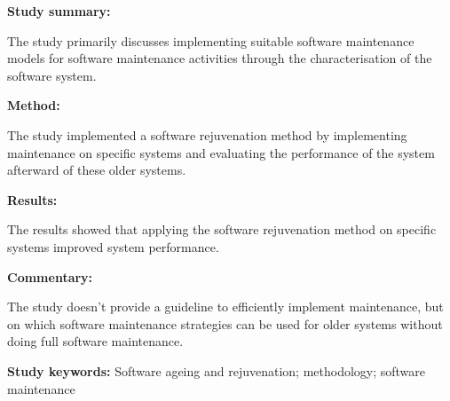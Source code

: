 \begin{tcolorbox}[colback=gray!5!white, colframe=pastelgreen!40!black, title=A Software Maintenance Methodology: An Approach Applied to Software Aging\cite{Araujo2021}]
	\begin{minipage}[t]{0.25\textwidth}
		\textbf{Study summary:}
	\end{minipage}
	\hfill
	\begin{minipage}[t]{0.65\textwidth}
		The study primarily discusses implementing suitable software maintenance models for software
maintenance activities through the characterisation of the software system.
	\end{minipage}

	\vspace{0.75em} 

	\begin{minipage}[t]{0.25\textwidth}
		\textbf{Method:}
	\end{minipage}
	\hfill
	\begin{minipage}[t]{0.65\textwidth}
		The study implemented a software rejuvenation method by implementing maintenance on specific systems and evaluating the performance of the system afterward of these older systems.
	\end{minipage}

	\vspace{0.75em} 

	\begin{minipage}[t]{0.25\textwidth}
		\textbf{Results:}
	\end{minipage}
	\hfill
	\begin{minipage}[t]{0.65\textwidth}
		The results showed that applying the software rejuvenation method on specific systems improved system performance.
	\end{minipage}

	\vspace{0.75em} 

	\begin{minipage}[t]{0.25\textwidth}
		\textbf{Commentary:}
	\end{minipage}
	\hfill
	\begin{minipage}[t]{0.65\textwidth}
		The study doesn't provide a guideline to efficiently implement maintenance, but on which
software maintenance strategies can be used for older systems without doing full software maintenance.
	\end{minipage}
	\tcblower
	\textbf{Study keywords:} Software ageing and rejuvenation; methodology; software maintenance
\end{tcolorbox}

